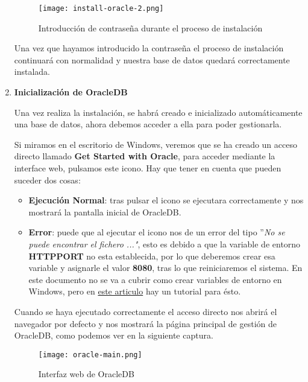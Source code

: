 \begin{enumerate}
    \begin{figure}[ht]
        \centering
        \texttt{[image: install-oracle-2.png]}
        \caption{Introducción de contraseña durante el proceso de instalación}
    \end{figure}

    Una vez que hayamos introducido la contraseña el proceso de instalación continuará con normalidad y nuestra base de datos quedará correctamente instalada.

    \item \textbf{Inicialización de OracleDB}

    Una vez realiza la instalación, se habrá creado e inicializado automáticamente una base de datos, ahora debemos acceder a ella para poder gestionarla.

    Si miramos en el escritorio de Windows, veremos que se ha creado un acceso directo llamado \textbf{Get Started with Oracle}, para acceder mediante la interface web, pulsamos este icono. Hay que tener en cuenta que pueden suceder dos cosas:

    \begin{itemize}
        \item \textbf{Ejecución Normal}: tras pulsar el icono se ejecutara correctamente y nos mostrará la pantalla inicial de OracleDB.
        \item \textbf{Error}: puede que al ejecutar el icono nos de un error del tipo ''\textit{No se puede encontrar el fichero ..."}, esto es debido a que la variable de entorno \textbf{HTTPPORT} no esta establecida, por lo que deberemos crear esa variable y asignarle el valor \textbf{8080}, tras lo que reiniciaremos el sistema. En este documento no se va a cubrir como crear variables de entorno en Windows, pero en \href{https://medium.com/@01luisrene/como-agregar-variables-de-entorno-s-o-windows-10-e7f38851f11f}{este articulo} hay un tutorial para ésto.
    \end{itemize}

    Cuando se haya ejecutado correctamente el acceso directo nos abrirá el navegador por defecto y nos mostrará la página principal de gestión de OracleDB, como podemos ver en la siguiente captura.

    \begin{figure}[ht]
        \centering
        \texttt{[image: oracle-main.png]}
        \caption{Interfaz web de OracleDB}
    \end{figure}
\end{enumerate}







\newpage



